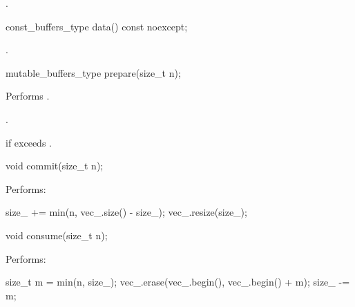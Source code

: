 \begin{itemdescr}
\pnum
\returns {}.
\end{itemdescr}

%
\begin{itemdecl}
const_buffers_type data() const noexcept;
\end{itemdecl}

\begin{itemdescr}
\pnum
\returns {}.
\end{itemdescr}

%
\begin{itemdecl}
mutable_buffers_type prepare(size_t n);
\end{itemdecl}

\begin{itemdescr}
\pnum
\effects Performs .

\pnum
\returns {}.

\pnum
\remarks {} if  exceeds .
\end{itemdescr}

%
\begin{itemdecl}
void commit(size_t n);
\end{itemdecl}

\begin{itemdescr}
\pnum
\effects Performs:
\begin{codeblock}
size_ += min(n, vec_.size() - size_);
vec_.resize(size_);
\end{codeblock}

\end{itemdescr}

%
\begin{itemdecl}
void consume(size_t n);
\end{itemdecl}

\begin{itemdescr}
\pnum
\effects Performs:
\begin{codeblock}
size_t m = min(n, size_);
vec_.erase(vec_.begin(), vec_.begin() + m);
size_ -= m;
\end{codeblock}

\end{itemdescr}



